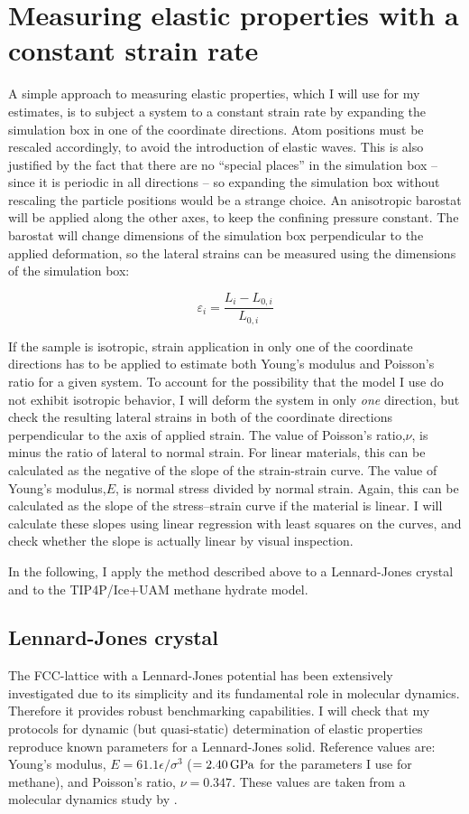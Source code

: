 \section{Measuring elastic properties with a constant strain rate}
A simple approach to measuring elastic properties, which I will use for my estimates, is to subject a system to a constant strain rate by expanding the simulation box in one of the coordinate directions. Atom positions must be rescaled accordingly, to avoid the introduction of elastic waves. This is also justified by the fact that there are no ``special places'' in the simulation box -- since it is periodic in all directions -- so expanding the simulation box without rescaling the particle positions would be a strange choice. An anisotropic barostat will be applied along the other axes, to keep the confining pressure constant. The barostat will change dimensions of the simulation box perpendicular to the applied deformation, so the lateral strains can be measured using the dimensions of the simulation box:

\begin{equation}
\varepsilon_i = \frac{L_i-L_{0, i}}{L_{0, i}}
\end{equation}

If the sample is isotropic, strain application in only one of the coordinate directions has to be applied to estimate both Young's modulus and Poisson's ratio for a given system. To account for the possibility that the model I use do not exhibit isotropic behavior, I will deform the system in only \emph{one} direction, but check the resulting lateral strains in both of the coordinate directions perpendicular to the axis of applied strain. The value of Poisson's ratio,$\nu$, is minus the ratio of lateral to normal strain. For linear materials, this can be calculated as the negative of the slope of the strain-strain curve. The value of Young's modulus,$E$, is normal stress divided by normal strain. Again, this can be calculated as the slope of the stress--strain curve if the material is linear. I will calculate these slopes using linear regression with least squares on the curves, and check whether the slope is actually linear by visual inspection.

In the following, I apply the method described above to a Lennard-Jones crystal and to the TIP4P/Ice+UAM methane hydrate model.

\subsection{Lennard-Jones crystal}
The FCC-lattice with a Lennard-Jones potential has been extensively investigated due to its simplicity and its fundamental role in molecular dynamics. Therefore it provides robust benchmarking capabilities. I will check that my protocols for dynamic (but quasi-static) determination of elastic properties reproduce known parameters for a Lennard-Jones solid. Reference values are: Young's modulus, $E=61.1 \epsilon/\sigma^3$ ($ = \text{\SI{2.40}{\giga\pascal}}$ for the parameters I use for methane), and Poisson's ratio, $\nu=0.347$. These values are taken from a molecular dynamics study by \citet{Quesnel1993}.

